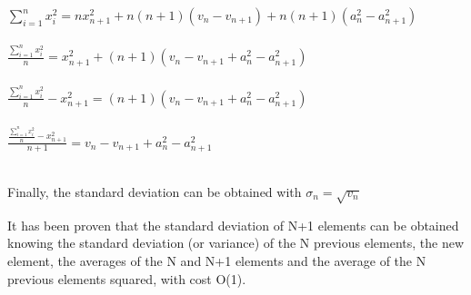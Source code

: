\noindent
$ {\displaystyle \sum_{i=1}^{n}x_i^2 = nx_{n+1}^2 + n(n+1)(v_n-v_{n+1}) + n(n+1)(a_n^2-a_{n+1}^2) } $\\\\

\noindent
$ {\displaystyle \frac{\sum_{i=1}^{n}x_i^2}{n} = x_{n+1}^2 + (n+1)(v_n-v_{n+1} + a_n^2-a_{n+1}^2) } $\\\\

\noindent
$ {\displaystyle \frac{\sum_{i=1}^{n}x_i^2}{n} - x_{n+1}^2 = (n+1)(v_n-v_{n+1} + a_n^2-a_{n+1}^2) } $\\\\

\noindent
$ {\displaystyle \frac{\frac{\sum_{i=1}^{n}x_i^2}{n} - x_{n+1}^2}{n+1} = v_n-v_{n+1} + a_n^2-a_{n+1}^2 } $\\\\

\noindent
{}

\vspace{5mm}

Finally, the standard deviation can be obtained with $\sigma_n=\sqrt{v_n}$

It has been proven that the standard deviation of N+1 elements can be obtained knowing the standard deviation (or variance) of the N previous elements, the new element, the averages of the N and N+1 elements and the average of the N previous elements squared, with cost O(1).
